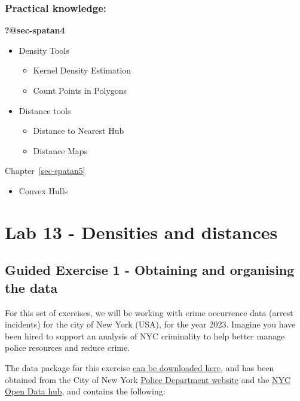 \documentclass[
  letterpaper,
  DIV=11,
  numbers=noendperiod]{scrreprt}
\providecommand{\tightlist}{%
  \setlength{\itemsep}{0pt}\setlength{\parskip}{0pt}}\usepackage{longtable,booktabs,array}
\begin{document}
\subsection*{Practical knowledge:}\label{practical-knowledge-6}

\textbf{?@sec-spatan4}

\begin{itemize}
\tightlist
\item
  Density Tools

  \begin{itemize}
  \tightlist
  \item
    Kernel Density Estimation
  \item
    Count Points in Polygons
  \end{itemize}
\item
  Distance tools

  \begin{itemize}
  \tightlist
  \item
    Distance to Nearest Hub
  \item
    Distance Maps
  \end{itemize}
\end{itemize}

Chapter~\ref{sec-spatan5}

\begin{itemize}
\tightlist
\item
  Convex Hulls
\end{itemize}

\chapter{Lab 13 - Densities and
distances}\label{lab-13---densities-and-distances}

\section{Guided Exercise 1 - Obtaining and organising the
data}\label{guided-exercise-1---obtaining-and-organising-the-data}

For this set of exercises, we will be working with crime occurrence data
(arrest incidents) for the city of New York (USA), for the year 2023.
Imagine you have been hired to support an analysis of NYC criminality to
help better manage police resources and reduce crime.

The data package for this exercise
\href{https://stir-my.sharepoint.com/:u:/g/personal/ala2_stir_ac_uk/EV4-dGBg819Al09dLzpJa7YBz1tERVtYuY6gaIqxLrkBGA?e=W5gSgV}{can
be downloaded here}, and has been obtained from the City of New York
\href{https://www.nyc.gov/site/nypd/stats/crime-statistics/citywide-crime-stats.page}{Police
Department website} and the
\href{https://opendata.cityofnewyork.us/}{NYC Open Data hub}, and
contains the following:
\end{document}
